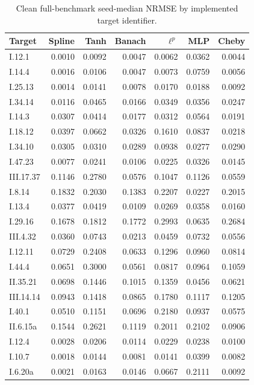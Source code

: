 \begin{longtable}{lrrrrrr}
\caption{Clean full-benchmark seed-median NRMSE by implemented target identifier.}\\
\toprule Target & Spline & Tanh & Banach & $\ell^p$ & MLP & Cheby \\ \midrule \endhead
I.12.1 & 0.0010 & 0.0092 & 0.0047 & 0.0062 & 0.0362 & 0.0044 \\
I.14.4 & 0.0016 & 0.0106 & 0.0047 & 0.0073 & 0.0759 & 0.0056 \\
I.25.13 & 0.0014 & 0.0141 & 0.0078 & 0.0170 & 0.0188 & 0.0092 \\
I.34.14 & 0.0116 & 0.0465 & 0.0166 & 0.0349 & 0.0356 & 0.0247 \\
I.14.3 & 0.0307 & 0.0414 & 0.0177 & 0.0312 & 0.0564 & 0.0191 \\
I.18.12 & 0.0397 & 0.0662 & 0.0326 & 0.1610 & 0.0837 & 0.0218 \\
I.34.10 & 0.0305 & 0.0310 & 0.0289 & 0.0938 & 0.0277 & 0.0290 \\
I.47.23 & 0.0077 & 0.0241 & 0.0106 & 0.0225 & 0.0326 & 0.0145 \\
III.17.37 & 0.1146 & 0.2780 & 0.0576 & 0.1047 & 0.1126 & 0.0559 \\
I.8.14 & 0.1832 & 0.2030 & 0.1383 & 0.2207 & 0.0227 & 0.2015 \\
I.13.4 & 0.0377 & 0.0419 & 0.0109 & 0.0269 & 0.0358 & 0.0160 \\
I.29.16 & 0.1678 & 0.1812 & 0.1772 & 0.2993 & 0.0635 & 0.2684 \\
III.4.32 & 0.0360 & 0.0743 & 0.0213 & 0.0459 & 0.0732 & 0.0556 \\
I.12.11 & 0.0729 & 0.2408 & 0.0633 & 0.1296 & 0.0960 & 0.0814 \\
I.44.4 & 0.0651 & 0.3000 & 0.0561 & 0.0817 & 0.0964 & 0.1059 \\
II.35.21 & 0.0698 & 0.1446 & 0.1015 & 0.1359 & 0.0456 & 0.0621 \\
III.14.14 & 0.0943 & 0.1418 & 0.0865 & 0.1780 & 0.1117 & 0.1205 \\
I.40.1 & 0.0510 & 0.1151 & 0.0696 & 0.2180 & 0.0937 & 0.0575 \\
II.6.15a & 0.1544 & 0.2621 & 0.1119 & 0.2011 & 0.2102 & 0.0906 \\
I.12.4 & 0.0028 & 0.0206 & 0.0114 & 0.0229 & 0.0238 & 0.0100 \\
I.10.7 & 0.0018 & 0.0144 & 0.0081 & 0.0141 & 0.0399 & 0.0082 \\
I.6.20a & 0.0021 & 0.0163 & 0.0146 & 0.0667 & 0.2111 & 0.0092 \\

\end{longtable}
